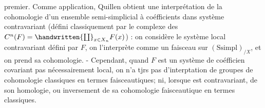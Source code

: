 
premier. Comme application, Quillen obtient une interprétation  de la cohomologie d'un ensemble semi-simplicial à coéfficients dans  système  contravariant   (défini classiquement par le complexe  des $C^n(F)=\handwritten{\coprod}_{x\in X_n}F(x)$) : on considère le système local contravariant défini par $F$, on l'interprète comme un faisceau sur  $(\mathrm{Ssimpl})_{/X}$, et on prend sa cohomologie. - Cependant, quand $F$ est un système de coéfficien covariant pas nécessairement local, on n'a tjrs pas d'interptation de  groupes de cohomologie classiques en termes faisceautiques; ni, lorsque  est contravariant, de son homologie, ou inversement de sa cohomologie faisceautique en termes classiques.

